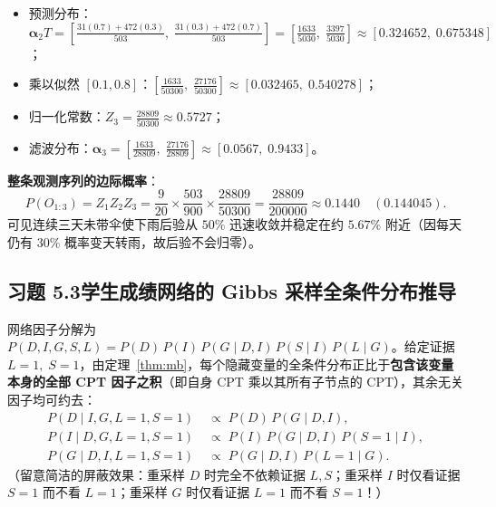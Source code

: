 \begin{enumerate}[label=\textbf{第 \arabic* 天:}, leftmargin=4.2em]
\begin{itemize}
    \item 预测分布：$\boldsymbol{\alpha}_2 T = \left[\frac{31(0.7)+472(0.3)}{503},\; \frac{31(0.3)+472(0.7)}{503}\right] = \left[\frac{1633}{5030},\; \frac{3397}{5030}\right] \approx [0.324652,\; 0.675348]$；
    \item 乘以似然 $[0.1, 0.8]$：$\left[\frac{1633}{50300},\; \frac{27176}{50300}\right] \approx [0.032465,\; 0.540278]$；
    \item 归一化常数：$Z_3 = \frac{28809}{50300} \approx \mathbf{0.5727}$；
    \item 滤波分布：$\boldsymbol{\alpha}_3 = \left[\frac{1633}{28809},\; \frac{27176}{28809}\right] \approx [\mathbf{0.0567},\; \mathbf{0.9433}]$。
  \end{itemize}
\end{enumerate}
\textbf{整条观测序列的边际概率}：
\[
  P(O_{1:3}) = Z_1 Z_2 Z_3 = \frac{9}{20} \times \frac{503}{900} \times \frac{28809}{50300} = \frac{28809}{200000} \approx \mathbf{0.1440}\quad (0.144045).
\]
可见连续三天未带伞使下雨后验从 $50\%$ 迅速收敛并稳定在约 $5.67\%$ 附近（因每天仍有 $30\%$ 概率变天转雨，故后验不会归零）。

\subsection*{习题 5.3\quad 学生成绩网络的 Gibbs 采样全条件分布推导}
网络因子分解为 $P(D, I, G, S, L) = P(D)\, P(I)\, P(G \mid D, I)\, P(S \mid I)\, P(L \mid G)$。给定证据 $L=1,\; S=1$，由定理~\ref{thm:mb}，每个隐藏变量的全条件分布正比于\textbf{包含该变量本身的全部 CPT 因子之积}（即自身 CPT 乘以其所有子节点的 CPT），其余无关因子均可约去：
\begin{align*}
  P(D \mid I, G, L=1, S=1) &\;\propto\; P(D)\, P(G \mid D, I), \\
  P(I \mid D, G, L=1, S=1) &\;\propto\; P(I)\, P(G \mid D, I)\, P(S=1 \mid I), \\
  P(G \mid D, I, L=1, S=1) &\;\propto\; P(G \mid D, I)\, P(L=1 \mid G).
\end{align*}
（留意简洁的屏蔽效果：重采样 $D$ 时完全不依赖证据 $L, S$；重采样 $I$ 时仅看证据 $S=1$ 而不看 $L=1$；重采样 $G$ 时仅看证据 $L=1$ 而不看 $S=1$！）

